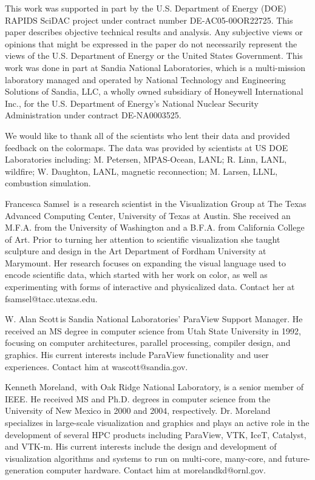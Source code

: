 \documentclass{IEEEcsmag}
\begin{document}
This work was supported in part by the U.S. Department of Energy (DOE) RAPIDS SciDAC project under contract number DE-AC05-00OR22725. This paper describes objective technical results and analysis. Any subjective views or opinions that might be expressed in the paper do not necessarily represent the views of the U.S. Department of Energy or the United States Government. This work was done in part at Sandia National Laboratories, which is a multi-mission laboratory managed and operated by National Technology and Engineering Solutions of Sandia, LLC, a wholly owned subsidiary of Honeywell International Inc., for the U.S. Department of Energy's National Nuclear Security Administration under contract DE-NA0003525.

We would like to thank all of the scientists who lent their data and provided feedback on the colormaps. The data was provided by scientists at US DOE Laboratories including: M. Petersen, MPAS-Ocean, LANL; R. Linn, LANL, wildfire; W. Daughton, LANL, magnetic reconnection; M. Larsen, LLNL, combustion simulation.





\begin{IEEEbiography}{Francesca Samsel}{\,} is a research scientist in the Visualization Group at The Texas Advanced Computing Center, University of Texas at Austin. She received an M.F.A. from the University of Washington and a B.F.A. from California College of Art. Prior to turning her attention to scientific visualization she taught sculpture and design in the Art Department of Fordham University at Marymount. Her research focuses on expanding the visual language used to encode scientific data, which started with her work on color, as well as experimenting with forms of interactive and physicalized data. Contact her at fsamsel@tacc.utexas.edu.
\end{IEEEbiography}

\begin{IEEEbiography}{W. Alan Scott}{\,}is Sandia National Laboratories' ParaView Support Manager.  He received an MS degree in computer science from Utah State University in 1992, focusing on computer architectures, parallel processing, compiler design, and graphics.  His current interests include ParaView functionality and user experiences.  Contact him at wascott@sandia.gov.
\end{IEEEbiography}

\begin{IEEEbiography}{Kenneth Moreland,}{\,} with Oak Ridge National Laboratory, is a senior member of IEEE.
  He received MS and Ph.D. degrees in computer science from the University of New Mexico in 2000 and 2004, respectively.
  Dr. Moreland specializes in large-scale visualization and graphics and plays an active role in the development of several HPC products including ParaView, VTK, IceT, Catalyst, and VTK-m.
  His current interests include the design and development of visualization algorithms and systems to run on multi-core, many-core, and future-generation computer hardware.
  Contact him at morelandkd@ornl.gov.
\end{IEEEbiography}
\end{document}
